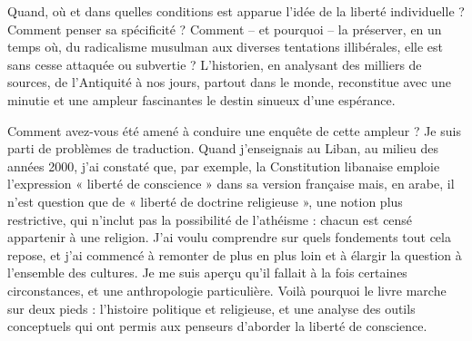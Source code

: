 Quand, où et dans quelles  conditions est apparue l’idée de la liberté individuelle ? Comment penser sa spécificité ? Comment – et pourquoi – la préserver, en un temps où, du radicalisme musulman aux diverses tentations illibérales, elle est sans cesse attaquée ou subvertie ? L’historien, en analysant des milliers de sources, de l’Antiquité à nos jours, partout dans le monde, reconstitue avec une minutie et une ampleur fascinantes le destin sinueux d’une espérance.

Comment avez-vous été amené à conduire une enquête de cette ampleur ?
Je suis parti de problèmes de traduction. Quand j’enseignais au Liban, au milieu des années 2000, j’ai constaté que, par exemple, la Constitution libanaise emploie l’expression « liberté de conscience » dans sa version française mais, en arabe, il n’est question que de « liberté de doctrine  religieuse », une notion plus restrictive, qui n’inclut pas la possibilité de l’athéisme : chacun est censé appartenir à une religion. J’ai voulu comprendre sur quels fondements tout cela repose, et j’ai commencé à remonter de plus en plus loin et à élargir la question à l’ensemble des cultures. Je me suis aperçu qu’il fallait à la fois certaines circonstances, et une anthropologie particulière. Voilà pourquoi le livre marche sur deux pieds : l’histoire  politique et religieuse, et une analyse des outils conceptuels qui ont permis aux penseurs d’aborder la liberté de conscience.
 
